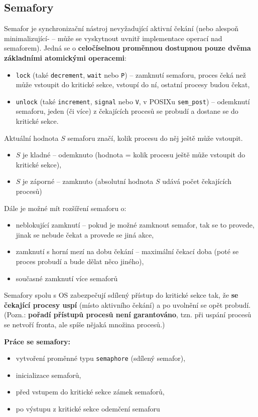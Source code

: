 \documentclass[a4paper, 11pt]{article}
\newcommand{\tcmd}[1]{\texttt{#1}}
\begin{document}
\subsection{Semafory}
Semafor je synchronizační nástroj nevyžadující aktivní čekání (nebo alespoň minimalizující- -- může se vyskytnout uvnitř implementace operací nad semaforem). Jedná se o \textbf{celočíselnou proměnnou dostupnou pouze dvěma základními atomickými operacemi}: 
\begin{itemize}
    \item \tcmd{lock} (také \tcmd{decrement}, \tcmd{wait} nebo \tcmd{P}) -- zamknutí semaforu, proces čeká než může vstoupit do kritické sekce, vstoupí do ní, ostatní procesy budou čekat,
    \item \tcmd{unlock} (také \tcmd{increment}, \tcmd{signal} nebo \tcmd{V}, v POSIXu \tcmd{sem\_post}) -- odemknutí semaforu, jeden (či více) z čekajících procesů se probudí a dostane se do kritické sekce.
\end{itemize}

Aktuální hodnota $S$ semaforu značí, kolik procesu do něj ještě může vstoupit.
\begin{itemize}
    \item $S$ je kladné -- odemknuto (hodnota = kolik procesu ještě může vstoupit do kritické sekce),
    \item $S$ je záporné -- zamknuto (absolutní hodnota $S$ udává počet čekajících procesů) 
\end{itemize}

\newpage
Dále je možné mít rozšíření semaforu o:
\begin{itemize}
    \item neblokující zamknutí -- pokud je možné zamknout semafor, tak se to provede, jinak se nebude čekat a provede se jiná akce,
    \item zamknutí s horní mezí na dobu čekání -- maximální čekací doba (poté se proces probudí a bude dělat něco jiného),
    \item současné zamknutí více semaforů
\end{itemize}
 
Semafory spolu s OS zabezpečují sdílený přístup do kritické sekce tak, že \textbf{se čekající procesy uspí} (místo aktivního čekání) a po uvolnění se opět probudí. (Pozn.: \textbf{pořadí přístupů procesů není garantováno}, tzn. při uspání procesů se netvoří fronta, ale spíše nějaká množina procesů.)

\textbf{Práce se semafory:}
\begin{itemize}
    \item vytvoření proměnné typu \tcmd{semaphore} (sdílený semafor),
    \item inicializace semaforů,
    \item před vstupem do kritické sekce zámek semaforů,
    \item po výstupu z kritické sekce odemčení semaforu
\end{itemize}
 
\end{document}
